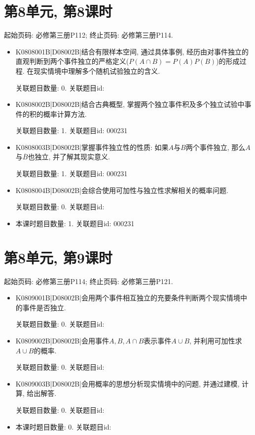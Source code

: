 \section*{第8单元, 第8课时}
起始页码: 必修第三册P112; 终止页码: 必修第三册P114.
\begin{itemize}
\item K0808001B|D08002B|结合有限样本空间, 通过具体事例, 经历由对事件独立的直观判断到两个事件独立的严格定义($P(A\cap B)=P(A)P(B)$)的形成过程. 在现实情境中理解多个随机试验独立的含义.

关联题目数量: 0. 关联题目id: 

\item K0808002B|D08002B|结合古典概型, 掌握两个独立事件积及多个独立试验中事件的积的概率计算方法.

关联题目数量: 1. 关联题目id: 000231

\item K0808003B|D08002B|掌握事件独立性的性质: 如果$A$与$B$两个事件独立, 那么$A$与$\overline B$也独立, 并了解其现实意义.

关联题目数量: 1. 关联题目id: 000231

\item K0808004B|D08002B|会综合使用可加性与独立性求解相关的概率问题.

关联题目数量: 0. 关联题目id: 

\item 本课时题目数量: 1. 关联题目id: 000231

\end{itemize}

\section*{第8单元, 第9课时}
起始页码: 必修第三册P114; 终止页码: 必修第三册P121.
\begin{itemize}
\item K0809001B|D08002B|会用两个事件相互独立的充要条件判断两个现实情境中的事件是否独立.

关联题目数量: 0. 关联题目id: 

\item K0809002B|D08002B|会用事件$A,B,A\cap B$表示事件$A\cup B$, 并利用可加性求$A\cup B$的概率.

关联题目数量: 0. 关联题目id: 

\item K0809003B|D08002B|会用概率的思想分析现实情境中的问题, 并通过建模, 计算, 给出解答.

关联题目数量: 0. 关联题目id: 

\item 本课时题目数量: 0. 关联题目id: 

\end{itemize}

